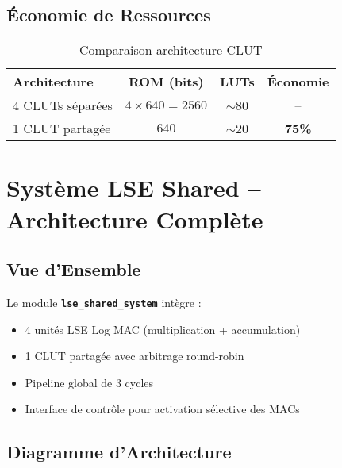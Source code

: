 \documentclass[12pt,a4paper]{article}
\newcommand{\module}[1]{\textbf{\texttt{#1}}}
\begin{document}
\subsection{Économie de Ressources}

\begin{table}[h]
\centering
\caption{Comparaison architecture CLUT}
\begin{tabular}{|l|c|c|c|}
\hline
\textbf{Architecture} & \textbf{ROM (bits)} & \textbf{LUTs} & \textbf{Économie} \\
\hline
4 CLUTs séparées & $4 \times 640 = 2560$ & $\sim$80 & -- \\
1 CLUT partagée  & $640$ & $\sim$20 & \textbf{75\%} \\
\hline
\end{tabular}
\end{table}

\section{Système LSE Shared -- Architecture Complète}

\subsection{Vue d'Ensemble}

Le module \module{lse\_shared\_system} intègre :
\begin{itemize}
    \item 4 unités LSE Log MAC (multiplication + accumulation)
    \item 1 CLUT partagée avec arbitrage round-robin
    \item Pipeline global de 3 cycles
    \item Interface de contrôle pour activation sélective des MACs
\end{itemize}

\subsection{Diagramme d'Architecture}
\end{document}

